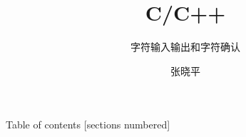 \documentclass[10pt]{beamer}
\title{C/C++}
\subtitle{字符输入输出和字符确认}
\date{}%
\author{张晓平}
\institute{武汉大学数学与统计学院}
\newcommand\Fontvi{\fontsize{6.5}{7.2}\selectfont}
\begin{document}
\maketitle

\begin{frame}{Table of contents}
  [sections numbered]
  \tableofcontents[hideallsubsections]
\end{frame}











\end{document}
